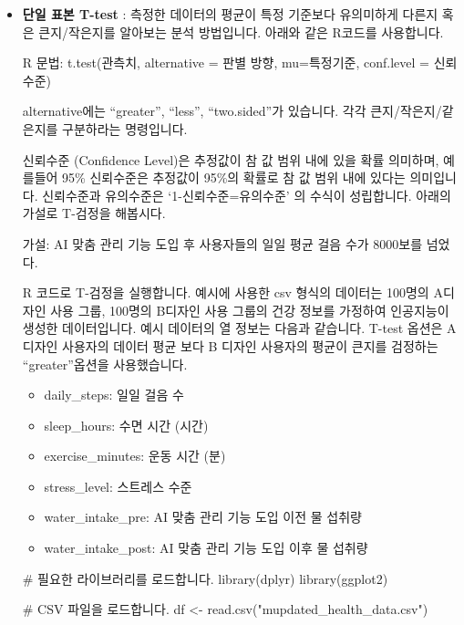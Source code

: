 \documentclass[
  letterpaper,
]{book}
\newenvironment{Shaded}{\begin{snugshade}}{\end{snugshade}}
\newcommand{\CommentTok}[1]{\textcolor[rgb]{0.37,0.37,0.37}{#1}}
\newcommand{\FunctionTok}[1]{\textcolor[rgb]{0.28,0.35,0.67}{#1}}
\newcommand{\NormalTok}[1]{\textcolor[rgb]{0.00,0.23,0.31}{#1}}
\newcommand{\OtherTok}[1]{\textcolor[rgb]{0.00,0.23,0.31}{#1}}
\newcommand{\StringTok}[1]{\textcolor[rgb]{0.13,0.47,0.30}{#1}}
\providecommand{\tightlist}{%
  \setlength{\itemsep}{0pt}\setlength{\parskip}{0pt}}\usepackage{longtable,booktabs,array}
\renewenvironment{Shaded}
    {\begin{snugshade}
    \begin{singlespace}
    \linespread{1}
    }
    {\end{singlespace}
    \end{snugshade}
}
\begin{document}
\begin{itemize}
\item
  \textbf{단일 표본 T-test} : 측정한 데이터의 평균이 특정 기준보다
  유의미하게 다른지 혹은 큰지/작은지를 알아보는 분석 방법입니다. 아래와
  같은 R코드를 사용합니다.

  R 문법: t.test(관측치, alternative = 판별 방향, mu=특정기준,
  conf.level = 신뢰수준)

  alternative에는 ``greater'', ``less'', ``two.sided''가 있습니다. 각각
  큰지/작은지/같은지를 구분하라는 명령입니다.

  신뢰수준 (Confidence Level)은 추정값이 참 값 범위 내에 있을 확률
  의미하며, 예를들어 95\% 신뢰수준은 추정값이 95\%의 확률로 참 값 범위
  내에 있다는 의미입니다. 신뢰수준과 유의수준은 `1-신뢰수준=유의수준' 의
  수식이 성립합니다. 아래의 가설로 T-검정을 해봅시다.

  가설: AI 맞춤 관리 기능 도입 후 사용자들의 일일 평균 걸음 수가
  8000보를 넘었다.

  R 코드로 T-검정을 실행합니다. 예시에 사용한 csv 형식의 데이터는
  100명의 A디자인 사용 그룹, 100명의 B디자인 사용 그룹의 건강 정보를
  가정하여 인공지능이 생성한 데이터입니다. 예시 데이터의 열 정보는
  다음과 같습니다. T-test 옵션은 A 디자인 사용자의 데이터 평균 보다 B
  디자인 사용자의 평균이 큰지를 검정하는 ``greater''옵션을 사용했습니다.

  \begin{itemize}
  \tightlist
  \item
    daily\_steps: 일일 걸음 수
  \item
    sleep\_hours: 수면 시간 (시간)
  \item
    exercise\_minutes: 운동 시간 (분)
  \item
    stress\_level: 스트레스 수준
  \item
    water\_intake\_pre: AI 맞춤 관리 기능 도입 이전 물 섭취량
  \item
    water\_intake\_post: AI 맞춤 관리 기능 도입 이후 물 섭취량
  \end{itemize}

\begin{Shaded}
\begin{Highlighting}[]
\CommentTok{\# 필요한 라이브러리를 로드합니다.}
\FunctionTok{library}\NormalTok{(dplyr)}
\FunctionTok{library}\NormalTok{(ggplot2)}

\CommentTok{\# CSV 파일을 로드합니다.}
\NormalTok{df }\OtherTok{\textless{}{-}} \FunctionTok{read.csv}\NormalTok{(}\StringTok{"mupdated\_health\_data.csv"}\NormalTok{)}


\end{Highlighting}
\end{Shaded}
\end{itemize}
\end{document}
